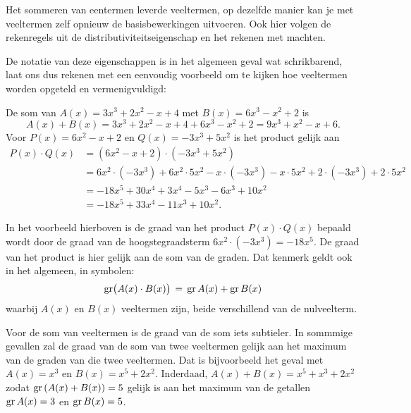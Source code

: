 \documentclass{ximera}
\begin{document}
	\author{Koen de Naeghel - Wiskunde Op Maat}
    \xmsource


Het sommeren van eentermen leverde veeltermen, op dezelfde manier kan je met veeltermen zelf opnieuw de basisbewerkingen uitvoeren. Ook hier volgen de rekenregels uit de distributiviteitseigenschap en het rekenen met machten. 


De notatie van deze eigenschappen is in het algemeen geval wat schrikbarend, laat ons dus rekenen met een eenvoudig voorbeeld om te kijken hoe veeltermen worden opgeteld en vermenigvuldigd: 

\begin{example} 
De som van \(A(x) = 3x^3+2x^2-x+4\) met \(B(x) = 6x^3-x^2+2\) is  
\[
A(x) + B(x) = 3x^3+2x^2-x+4 + 6x^3-x^2+2 = 9x^3 + x^2 - x + 6.
\]
Voor \(P(x) = 6x^2-x+2\) en \(Q(x) = -3x^3+5x^2\) is het product gelijk aan
\begin{align*}
P(x) \cdot Q(x) 
& = (6x^2-x+2) \cdot (-3x^3+5x^2) \\
& = 6x^2 \cdot (-3x^3) + 6x^2\cdot 5x^2 - x \cdot(-3x^3) - x \cdot 5x^2 + 2 \cdot(-3x^3) + 2 \cdot 5x^2 \\
& = -18x^5 + 30x^4 + 3x^4 - 5x^3 - 6x^3 + 10x^2 \\
& = -18x^5 + 33x^4 - 11x^3 + 10x^2.
\end{align*}
\end{example} 


In het voorbeeld hierboven is de graad van het product \(P(x) \cdot Q(x)\) bepaald wordt door de graad van de hoogstegraadsterm \(6x^2 \cdot (-3x^3) = -18 x^{5}\). De graad van het product is hier gelijk aan de som van de graden. Dat kenmerk geldt ook in het algemeen, in symbolen: 
\begin{equation} 
\operatorname{gr}\bigl( A(x) \cdot B(x) \bigr) \, = \, \operatorname{gr} A(x) + \operatorname{gr} B(x)
\end{equation}
waarbij \(A(x)\) en \(B(x)\) veeltermen zijn, beide verschillend van de nulveelterm. 


Voor de som van veeltermen is de graad van de som iets subtieler. In sommmige gevallen zal de graad van de som van twee veeltermen gelijk aan het maximum van de graden van die twee veeltermen. Dat is bijvoorbeeld het geval met 
\(A(x) = x^3\) en \(B(x) = x^5 + 2x^2\). Inderdaad, \(A(x) + B(x) = x^5 + x^3 + 2x^2\) zodat \(\operatorname{gr}\left(A(x) + B(x)\right) = 5\) gelijk is aan het maximum van de getallen \(\operatorname{gr} A(x) = 3\) en \(\operatorname{gr} B(x) = 5\). %
\end{document}
